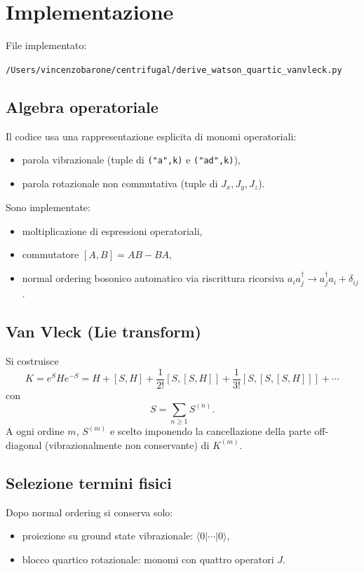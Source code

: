 \documentclass[11pt,a4paper]{article}
\begin{document}
\section{Implementazione}
File implementato:
\begin{center}
\texttt{/Users/vincenzobarone/centrifugal/derive\_watson\_quartic\_vanvleck.py}
\end{center}

\subsection{Algebra operatoriale}
Il codice usa una rappresentazione esplicita di monomi operatoriali:
\begin{itemize}
\item parola vibrazionale (tuple di \texttt{("a",k)} e \texttt{("ad",k)}),
\item parola rotazionale non commutativa (tuple di \(J_x,J_y,J_z\)).
\end{itemize}

Sono implementate:
\begin{itemize}
\item moltiplicazione di espressioni operatoriali,
\item commutatore \([A,B]=AB-BA\),
\item normal ordering bosonico automatico via riscrittura ricorsiva
\(a_i a_j^\dagger \to a_j^\dagger a_i + \delta_{ij}\).
\end{itemize}

\subsection{Van Vleck (Lie transform)}
Si costruisce
\begin{equation}
K = e^{S} H e^{-S} = H + [S,H] + \frac{1}{2!}[S,[S,H]] + \frac{1}{3!}[S,[S,[S,H]]] + \cdots
\end{equation}
con
\begin{equation}
S = \sum_{n\ge1} S^{(n)}.
\end{equation}
A ogni ordine \(m\), \(S^{(m)}\) e scelto imponendo la cancellazione della parte off-diagonal
(vibrazionalmente non conservante) di \(K^{(m)}\).

\subsection{Selezione termini fisici}
Dopo normal ordering si conserva solo:
\begin{itemize}
\item proiezione su ground state vibrazionale: \(\langle 0|\cdots|0\rangle\),
\item blocco quartico rotazionale: monomi con quattro operatori \(J\).
\end{itemize}
\end{document}
